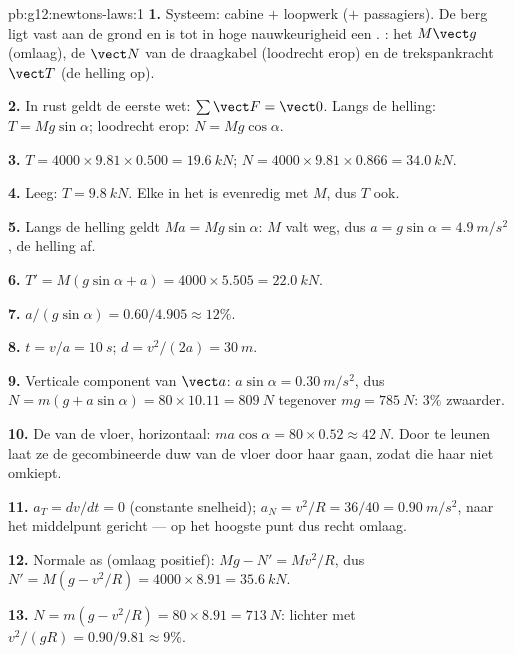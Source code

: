 \begin{solution}{pb:g12:newtons-laws:1}
\textbf{1.} Systeem: cabine $+$ loopwerk ($+$ passagiers). De berg ligt
vast aan de grond en is tot in hoge nauwkeurigheid een .
: het  $M\vect g$ (omlaag), de  $\vect N$ van
de draagkabel (loodrecht erop) en de trekspankracht $\vect T$ (de helling
op).

\textbf{2.} In rust geldt de eerste wet: $\sum \vect F = \vect 0$. Langs
de helling: $T = Mg\sin\alpha$; loodrecht erop: $N = Mg\cos\alpha$.

\textbf{3.} $T = 4000 \times 9.81 \times 0.500 = \qty{19.6}{kN}$;
$N = 4000 \times 9.81 \times 0.866 = \qty{34.0}{kN}$.

\textbf{4.} Leeg: $T = \qty{9.8}{kN}$. Elke  in het  is
evenredig met $M$, dus $T$ ook.

\textbf{5.} Langs de helling geldt $Ma = Mg\sin\alpha$: $M$ valt weg, dus
$a = g\sin\alpha = \qty{4.9}{m/s^2}$, de helling af.

\textbf{6.} $T' = M(g\sin\alpha + a) = 4000 \times 5.505 =
\qty{22.0}{kN}$.

\textbf{7.} $a/(g\sin\alpha) = 0.60/4.905 \approx 12\%$.

\textbf{8.} $t = v/a = \qty{10}{s}$; $d = v^2/(2a) = \qty{30}{m}$.

\textbf{9.} Verticale component van $\vect a$:
$a\sin\alpha = \qty{0.30}{m/s^2}$, dus
$N = m(g + a\sin\alpha) = 80 \times 10.11 = \qty{809}{N}$ tegenover
$mg = \qty{785}{N}$: $3\%$ zwaarder.

\textbf{10.} De  van de vloer, horizontaal:
$ma\cos\alpha = 80 \times 0.52 \approx \qty{42}{N}$. Door te leunen laat
ze de gecombineerde duw van de vloer door haar  gaan,
zodat die haar niet omkiept.

\textbf{11.} $a_T = dv/dt = 0$ (constante snelheid);
$a_N = v^2/R = 36/40 = \qty{0.90}{m/s^2}$, naar het middelpunt gericht ---
op het hoogste punt dus recht omlaag.

\textbf{12.} Normale as (omlaag positief): $Mg - N' = Mv^2/R$, dus
$N' = M(g - v^2/R) = 4000 \times 8.91 = \qty{35.6}{kN}$.

\textbf{13.} $N = m(g - v^2/R) = 80 \times 8.91 = \qty{713}{N}$: lichter
met $v^2/(gR) = 0.90/9.81 \approx 9\%$.


\end{solution}
